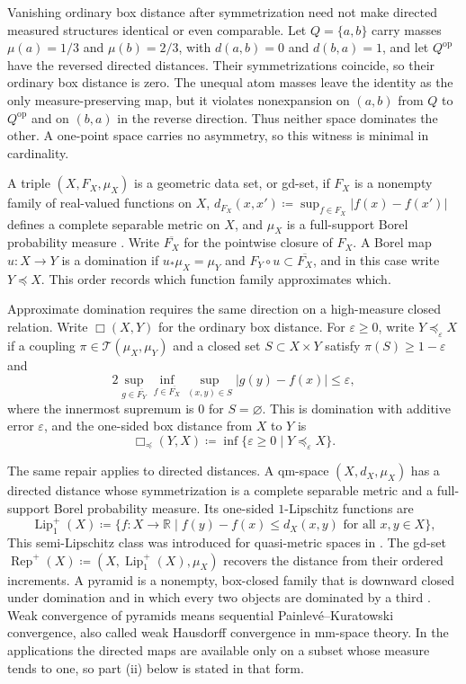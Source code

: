 \documentclass{amsart}
\theoremstyle{plain}
\theoremstyle{definition}
\theoremstyle{remark}
\newcommand{\R}{\mathbb{R}}
\newcommand{\lipplus}{\operatorname{Lip}^{+}_{1}}
\begin{document}
Vanishing ordinary box distance after symmetrization need not make directed
measured structures identical or even comparable.  Let
$Q=\{a,b\}$ carry masses $\mu(a)=1/3$ and $\mu(b)=2/3$, with
$d(a,b)=0$ and $d(b,a)=1$, and let $Q^{\mathrm{op}}$ have the reversed
directed distances.  Their symmetrizations coincide, so their ordinary box
distance is zero.  The unequal atom masses leave the identity as the only
measure-preserving map, but it violates nonexpansion on $(a,b)$ from
$Q$ to $Q^{\mathrm{op}}$ and on $(b,a)$ in the reverse direction.  Thus
neither space dominates the other.  A one-point space carries no asymmetry,
so this witness is minimal in cardinality.

A triple
$(X,F_X,\mu_X)$ is a geometric data set, or gd-set, if $F_X$ is a nonempty
family of real-valued functions on $X$,
$d_{F_X}(x,x')\coloneqq\sup_{f\in F_X}|f(x)-f(x')|$ defines a complete
separable metric on $X$, and $\mu_X$ is
a full-support Borel probability measure \cite[Definition~3.1]{gds1}.
Write $\overline{F_X}$ for the pointwise closure of $F_X$.  A Borel map
$u\colon X\to Y$ is a domination if
$u_*\mu_X=\mu_Y$ and
$F_Y\circ u\subset\overline{F_X}$, and in this case write $Y\preceq X$.
This order records which function family approximates which.

Approximate domination requires the same direction on a high-measure closed
relation.  Write $\Box(X,Y)$ for the ordinary box distance.  For
$\varepsilon\geq0$, write $Y\preceq_\varepsilon X$ if a coupling
$\pi\in\mathcal T(\mu_X,\mu_Y)$ and a closed set $S\subset X\times Y$
satisfy $\pi(S)\geq1-\varepsilon$ and
\[ 2\sup_{g\in\overline{F_Y}}\inf_{f\in\overline{F_X}}\sup_{(x,y)\in S}|g(y)-f(x)|\leq\varepsilon, \]
where the innermost supremum is $0$ for $S=\varnothing$.  This is domination
with additive error $\varepsilon$, and the one-sided box distance from $X$
to $Y$ is
\begin{equation}\label{eq:unilateral-box-distance}
\Box_{\preceq}(Y,X)\coloneqq\inf\{\varepsilon\geq0\mid Y\preceq_\varepsilon X\}.
\end{equation}

The same repair applies to directed distances.  A qm-space
$(X,d_X,\mu_X)$ has a directed distance whose symmetrization is a complete
separable metric and a full-support Borel probability measure.  Its
one-sided $1$-Lipschitz functions are
\[ \lipplus(X)\coloneqq\{f\colon X\to\R\mid f(y)-f(x)\leq d_X(x,y)\text{ for all }x,y\in X\}, \]
This semi-Lipschitz class was introduced for quasi-metric spaces in
\cite{romaguera2000semi}.  The gd-set
$\operatorname{Rep}^{+}(X)\coloneqq(X,\lipplus(X),\mu_X)$ recovers the
distance from their ordered increments.  A pyramid is a nonempty,
box-closed family that is downward closed under domination and in which
every two objects are dominated by a third \cite{gds2}.  Weak
convergence of pyramids means sequential Painlev\'e--Kuratowski convergence,
also called weak Hausdorff convergence in mm-space theory.  In the
applications the directed maps are available only on a subset whose measure
tends to one, so part \textup{(ii)} below is stated in that form.
\end{document}
